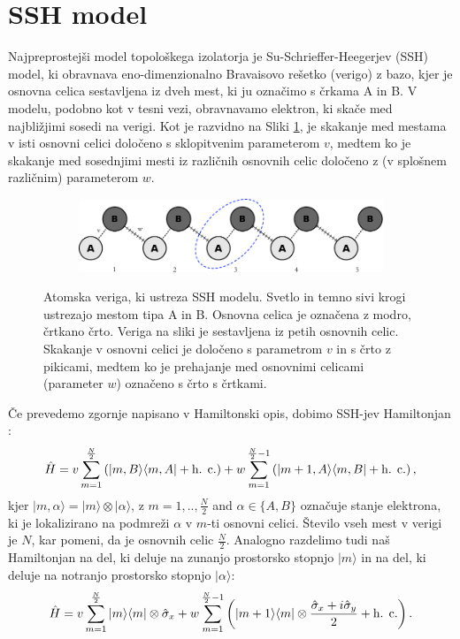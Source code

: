 \section{SSH model}
Najpreprostejši model topološkega izolatorja je Su-Schrieffer-Heegerjev (SSH) model, ki obravnava eno-dimenzionalno Bravaisovo rešetko (verigo) z bazo, kjer je osnovna celica sestavljena iz dveh mest, ki ju označimo s črkama A in B. V modelu, podobno kot v tesni vezi, obravnavamo elektron, ki skače med najbližjimi sosedi na verigi. Kot je razvidno na Sliki \ref{fig:chain}, je skakanje med mestama v isti osnovni celici določeno s sklopitvenim parameterom $v$, medtem ko je skakanje med sosednjimi mesti iz različnih osnovnih celic določeno z (v splošnem različnim) parameterom $w$.
\begin{figure}[H]
\centering
\begin{subfigure}{.9\textwidth}
\includegraphics[width=\linewidth]{Figures/MySSHChain.pdf}
\end{subfigure}
\caption{Atomska veriga, ki ustreza SSH modelu. Svetlo in temno sivi krogi ustrezajo mestom tipa A in B. Osnovna celica je označena z modro, črtkano črto. Veriga na sliki je sestavljena iz petih osnovnih celic. Skakanje v osnovni celici je določeno s parametrom $v$ in s črto z pikicami, medtem ko je prehajanje med osnovnimi celicami (parameter $w$) označeno s črto s črtkami.}
\label{fig:chain}
\end{figure}
Če prevedemo zgornje napisano v Hamiltonski opis, dobimo SSH-jev Hamiltonjan \cite{SSH}:
\begin{equation}
\hat{H} = v \sum_{m=1}^{\frac{N}{2}} \left( |m, B \rangle \langle m, A | + \textup{h. c.} \right) + w \sum_{m=1}^{\frac{N}{2}-1} \left( | m+1, A \rangle \langle m, B | + \textup{h. c.} \right),
\end{equation}
kjer $|m , \alpha \rangle = |m \rangle \otimes | \alpha \rangle$, z $m=1,.., \frac{N}{2}$ and $\alpha \in \{A,B\}$ označuje stanje elektrona, ki je lokalizirano na podmreži $\alpha$ v $m$-ti osnovni celici. Število vseh mest v verigi je $N$, kar pomeni, da je osnovnih celic $\frac{N}{2}$.  Analogno razdelimo tudi naš Hamiltonjan na del, ki deluje na zunanjo prostorsko stopnjo $|m \rangle$ in na del, ki deluje na notranjo prostorsko stopnjo $| \alpha \rangle$:
\begin{equation}
\hat{H} = v \sum_{m=1}^{\frac{N}{2}} |m \rangle \langle m| \otimes \hat{\sigma}_x + w \sum_{m=1}^{\frac{N}{2}-1} \left( | m+1\rangle \langle m | \otimes \frac{\hat{\sigma}_x + i \hat{\sigma}_y}{2} + \textup{h. c.} \right).
\end{equation}
\newpage
